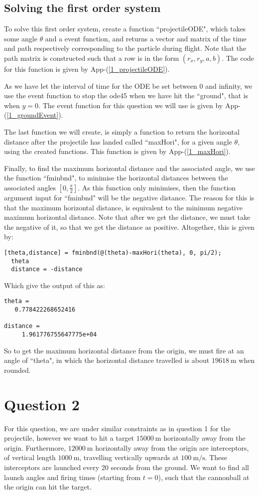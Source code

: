 \documentclass[12pt]{article}
\let\oldref\ref
\renewcommand{\ref}[1]{(\oldref{#1})}
\newcommand{\apref}[1]{App-\ref{#1}}
\begin{document}
\subsection{Solving the first order system}
To solve this first order system, create a function ``projectileODE", which takes some angle $\theta$ and a event function, and returns a vector and matrix of the time and path respectively corresponding to the particle during flight. Note that the path matrix is constructed such that a row is in the form $(r_x, r_y, a, b)$. The code for this function is given by \apref{1_projectileODE}.

As we have let the interval of time for the ODE be set between 0 and infinity, we use the event function to stop the ode45 when we have hit the ``ground", that is when $y=0$. The event function for this question we will use is given by \apref{1_groundEvent}.

The last function we will create, is simply a function to return the horizontal distance after the projectile has landed called ``maxHori", for a given angle $\theta$, using the created functions. This function is given by \apref{1_maxHori}.

Finally, to find the maximum horizontal distance and the associated angle, we use the function ``fminbnd", to minimise the horizontal distances between the associated angles $[0,\frac{\pi}{2}]$. As this function only minimises, then the function argument input for ``fminbnd" will be the negative distance. The reason for this is that the maximum horizontal distance, is equivalent to the minimum negative maximum horizontal distance. Note that after we get the distance, we must take the negative of it, so that we get the distance as positive. Altogether, this is given by:
\begin{lstlisting}[title={Main code}]
  [theta,distance] = fminbnd(@(theta)-maxHori(theta), 0, pi/2);
  theta
  distance = -distance
\end{lstlisting}
Which give the output of this as:
\begin{lstlisting}[title={Console output for question 1}]
theta =
   0.778422268652416

distance =
     1.961776755647775e+04
\end{lstlisting}
So to get the maximum horizontal distance from the origin, we must fire at an angle of ``theta", in which the horizontal distance travelled is about $\SI{19618}{\meter}$ when rounded.


\section{Question 2}
For this question, we are under similar constraints as in question 1 for the projectile, however we want to hit a target $\SI{15000}{\meter}$ horizontally away from the origin. Furthermore, $\SI{12000}{\meter}$ horizontally away from the origin  are interceptors, of vertical length $\SI{1000}{\meter}$, travelling vertically upwards at $\SI{100}{\meter\per\second}$. These interceptors are launched every 20 seconds from the ground. We want to find all launch angles and firing times (starting from $t=0$), such that the cannonball at the origin can hit the target.
\end{document}
